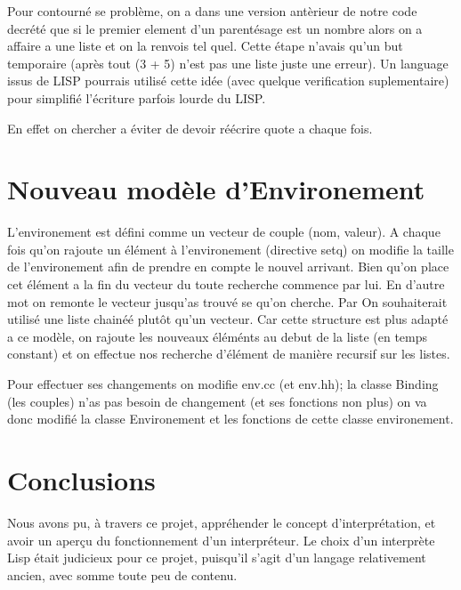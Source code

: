 \documentclass[a4paper,11pt]{article}
\begin{document}
	Pour contourné se problème, on a dans une version antèrieur de notre code decrété que si le premier element d'un parentésage est un nombre alors on a affaire a une liste et on la renvois tel quel. Cette étape n'avais qu'un but temporaire (après tout (3 + 5) n'est pas une liste juste une erreur). Un language issus de LISP pourrais utilisé cette idée (avec quelque verification suplementaire) pour simplifié l'écriture parfois lourde du LISP. 
	
	En effet on chercher a éviter de devoir réécrire quote a chaque fois.
	
\section{Nouveau modèle d'Environement}
	L'environement est défini comme un vecteur de couple (nom, valeur). A chaque fois qu'on rajoute un élément à l'environement (directive setq) on modifie la taille de l'environement afin de prendre en compte le nouvel arrivant. Bien qu'on place cet élément a la fin du vecteur du toute recherche commence par lui. En d'autre mot on remonte le vecteur jusqu'as trouvé se qu'on cherche. Par  On souhaiterait utilisé une liste chainéé plutôt qu'un vecteur. Car cette structure est plus adapté a ce modèle, on rajoute les nouveaux éléménts au debut de la liste (en temps constant) et on effectue nos recherche d'élément de manière recursif sur les listes.
	
	Pour effectuer ses changements on modifie env.cc (et env.hh); la classe Binding (les couples) n'as pas besoin de changement (et ses fonctions non plus) on va donc modifié la classe Environement et les fonctions de cette classe environement.
	
\section{Conclusions}
	
	
	
	Nous avons pu, à travers ce projet, appréhender le concept d'interprétation, et avoir un aperçu du fonctionnement d'un interpréteur. Le choix d'un interprète Lisp était judicieux pour ce projet, puisqu'il s'agit d'un langage relativement ancien, avec somme toute peu de contenu.
\end{document}
